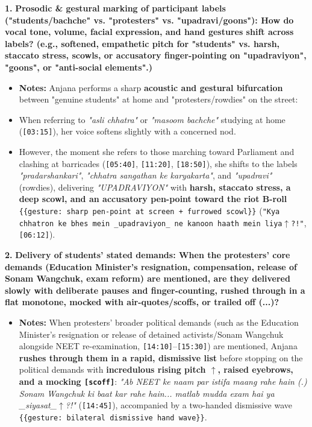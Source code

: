 \documentclass[10pt,a4paper]{article}
\begin{document}
\noindent\textbf{1.} \textbf{Prosodic \& gestural marking of participant labels ("students/bachche" vs. "protesters" vs. "upadravi/goons"): How do vocal tone, volume, facial expression, and hand gestures shift across labels? (e.g., softened, empathetic pitch for "students" vs. harsh, staccato stress, scowls, or accusatory finger-pointing on "upadraviyon", "goons", or "anti-social elements".)}\par\smallskip
\begin{itemize}
  \item \textbf{Notes:}
Anjana performs a sharp \textbf{acoustic and gestural bifurcation} between "genuine students" at home and "protesters/rowdies" on the street:\par\smallskip
  \item When referring to \textit{"asli chhatra"} or \textit{"masoom bachche"} studying at home (\texttt{[03:15]}), her voice softens slightly with a concerned nod.
  \item However, the moment she refers to those marching toward Parliament and clashing at barricades (\texttt{[05:40]}, \texttt{[11:20]}, \texttt{[18:50]}), she shifts to the labels \textit{"pradarshankari"}, \textit{"chhatra sangathan ke karyakarta"}, and \textit{"upadravi"} (rowdies), delivering \textit{"UPADRAVIYON"} with \textbf{harsh, staccato stress, a deep scowl, and an accusatory pen-point toward the riot B-roll} \texttt{\{\{gesture: sharp pen-point at screen + furrowed scowl\}\}} (\texttt{"Kya chhatron ke bhes mein \_upadraviyon\_ ne kanoon haath mein liya$\uparrow$?!"}, \texttt{[06:12]}).
\end{itemize}

\noindent\textbf{2.} \textbf{Delivery of students' stated demands: When the protesters' core demands (Education Minister's resignation, compensation, release of Sonam Wangchuk, exam reform) are mentioned, are they delivered slowly with deliberate pauses and finger-counting, rushed through in a flat monotone, mocked with air-quotes/scoffs, or trailed off (...)?}\par\smallskip
\begin{itemize}
  \item \textbf{Notes:}
When protesters' broader political demands (such as the Education Minister's resignation or release of detained activists/Sonam Wangchuk alongside NEET re-examination, \texttt{[14:10]}--\texttt{[15:30]}) are mentioned, Anjana \textbf{rushes through them in a rapid, dismissive list} before stopping on the political demands with \textbf{incredulous rising pitch \texttt{$\uparrow$}, raised eyebrows, and a mocking \texttt{[scoff]}}: \textit{"Ab NEET ke naam par istifa maang rahe hain (.) Sonam Wangchuk ki baat kar rahe hain... matlab mudda exam hai ya \_siyasat\_$\uparrow$?!"} (\texttt{[14:45]}), accompanied by a two-handed dismissive wave \texttt{\{\{gesture: bilateral dismissive hand wave\}\}}.\par\smallskip
\end{itemize}
\end{document}
